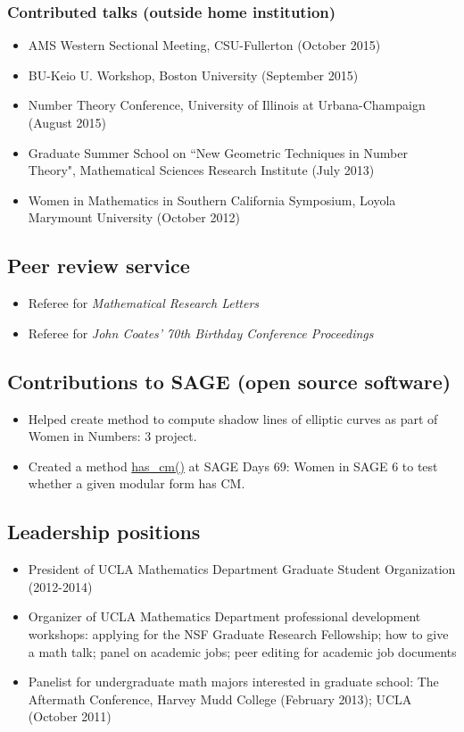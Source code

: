 \documentclass[12pt]{amsart}
\begin{document}
\subsubsection*{Contributed talks (outside home institution)}
\begin{itemize}
\item AMS Western Sectional Meeting, CSU-Fullerton (October 2015)
\item BU-Keio U. Workshop, Boston University (September 2015)
\item Number Theory Conference, University of Illinois at Urbana-Champaign (August 2015)
\item Graduate Summer School on ``New Geometric Techniques in Number Theory", Mathematical Sciences Research Institute (July 2013)
\item Women in Mathematics in Southern California Symposium, Loyola Marymount University (October 2012)
\end{itemize}

\subsection*{Peer review service}
\begin{itemize}
\item Referee for \textit{Mathematical Research Letters}
\item Referee for \textit{John Coates' 70th Birthday Conference Proceedings}
\end{itemize}

\subsection*{Contributions to SAGE (open source software)}
\begin{itemize}
\item Helped create method to compute shadow lines of elliptic curves as part of Women in Numbers: 3 project.
\item Created a method \url{has_cm()} at  SAGE Days 69: Women in SAGE 6 to test whether a given modular form has CM.
\end{itemize}

\subsection*{Leadership positions}
\begin{itemize}
\item President of UCLA Mathematics Department Graduate Student Organization (2012-2014)
\item Organizer of UCLA Mathematics Department professional development workshops: applying for the NSF Graduate Research Fellowship; how to give a math talk; panel on academic jobs; peer editing for academic job documents
\item Panelist for undergraduate math majors interested in graduate school:  The Aftermath Conference, Harvey Mudd College (February 2013); UCLA (October 2011)
\end{itemize}
\end{document}
